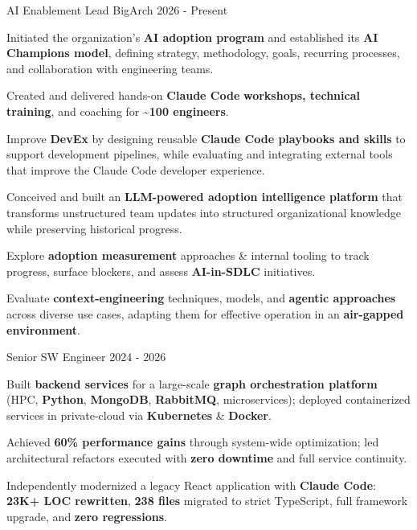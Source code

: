 \begin{cventries}
    \cventry
    {AI Enablement Lead}
    {BigArch}
    {}
    {2026 - Present}
    {
      \begin{cvitems}
        \item {Initiated the organization's \textbf{AI adoption program} and established its \textbf{AI Champions model}, defining strategy, methodology, goals, recurring processes, and collaboration with engineering teams.}
        \item {Created and delivered hands-on \textbf{Claude Code} \textbf{workshops, technical training}, and coaching for \textbf{\textasciitilde{}100 engineers}.}
        \item {Improve \textbf{DevEx} by designing reusable \textbf{Claude Code playbooks and skills} to support development pipelines, while evaluating and integrating external tools that improve the Claude Code developer experience.}
        \item {Conceived and built an \textbf{LLM-powered adoption intelligence platform} that transforms unstructured team updates into structured organizational knowledge while preserving historical progress.}
        \item {Explore \textbf{adoption measurement} approaches \& internal tooling to track progress, surface blockers, and assess \textbf{AI-in-SDLC} initiatives.}
        \item {Evaluate \textbf{context-engineering} techniques, models, and \textbf{agentic approaches} across diverse use cases, adapting them for effective operation in an \textbf{air-gapped environment}.}
      \end{cvitems}
    }
  \cventry
    {Senior SW Engineer}
    {}
    {}
    {2024 - 2026}
    {
      \begin{cvitems}
        \item {Built \textbf{backend services} for a large-scale \textbf{graph orchestration platform} (HPC, \textbf{Python}, \textbf{MongoDB}, \textbf{RabbitMQ}, microservices); deployed containerized services in private-cloud via \textbf{Kubernetes} \& \textbf{Docker}.}
        \item {Achieved \textbf{60\% performance gains} through system-wide optimization; led architectural refactors executed with \textbf{zero downtime} and full service continuity.}
        \item {Independently modernized a legacy React application with \textbf{Claude Code}: \textbf{23K+ LOC rewritten}, \textbf{238 files} migrated to strict TypeScript, full framework upgrade, and \textbf{zero regressions}.}

\end{cvitems}}
\end{cventries}
